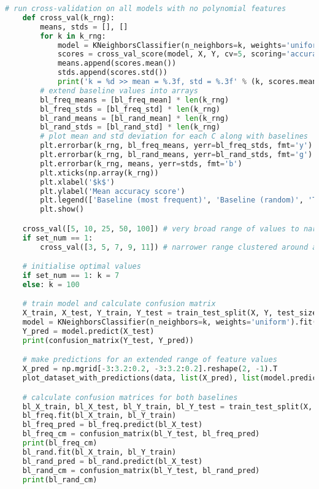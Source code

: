 \documentclass[12pt]{article}
\begin{document}
\begin{lstlisting}[language=Python]
    # run cross-validation on all models with no polynomial features
    def cross_val(k_rng):
        means, stds = [], []
        for k in k_rng:
            model = KNeighborsClassifier(n_neighbors=k, weights='uniform').fit(X, Y)
            scores = cross_val_score(model, X, Y, cv=5, scoring='accuracy')
            means.append(scores.mean())
            stds.append(scores.std())
            print('k = %d >> mean = %.3f, std = %.3f' % (k, scores.mean(), scores.std()))
        # extend baseline values into arrays
        bl_freq_means = [bl_freq_mean] * len(k_rng)
        bl_freq_stds = [bl_freq_std] * len(k_rng)
        bl_rand_means = [bl_rand_mean] * len(k_rng)
        bl_rand_stds = [bl_rand_std] * len(k_rng)
        # plot mean and std deviation for each C along with baselines
        plt.errorbar(k_rng, bl_freq_means, yerr=bl_freq_stds, fmt='y')
        plt.errorbar(k_rng, bl_rand_means, yerr=bl_rand_stds, fmt='g')
        plt.errorbar(k_rng, means, yerr=stds, fmt='b')
        plt.xticks(np.array(k_rng))
        plt.xlabel('$k$')
        plt.ylabel('Mean accuracy score')
        plt.legend(['Baseline (most frequent)', 'Baseline (random)', 'Trained model'])
        plt.show()

    cross_val([5, 10, 25, 50, 100]) # very broad range of values to narrow down optimal k
    if set_num == 1:
        cross_val([3, 5, 7, 9, 11]) # narrower range clustered around apparent optimal k

    # initialise optimal values
    if set_num == 1: k = 7
    else: k = 100

    # train model and calculate confusion matrix
    X_train, X_test, Y_train, Y_test = train_test_split(X, Y, test_size=0.2)
    model = KNeighborsClassifier(n_neighbors=k, weights='uniform').fit(X_train, Y_train)
    Y_pred = model.predict(X_test)
    print(confusion_matrix(Y_test, Y_pred))

    # make predictions for an extended range of feature values
    X_pred = np.mgrid[-3:3.2:0.2, -3:3.2:0.2].reshape(2, -1).T
    plot_dataset_with_predictions(data, list(X_pred), list(model.predict(X_pred)))

    # calculate confusion matrices for both baselines
    bl_X_train, bl_X_test, bl_Y_train, bl_Y_test = train_test_split(X, Y, test_size=0.2)
    bl_freq.fit(bl_X_train, bl_Y_train)
    bl_freq_pred = bl_freq.predict(bl_X_test)
    bl_freq_cm = confusion_matrix(bl_Y_test, bl_freq_pred)
    print(bl_freq_cm)
    bl_rand.fit(bl_X_train, bl_Y_train)
    bl_rand_pred = bl_rand.predict(bl_X_test)
    bl_rand_cm = confusion_matrix(bl_Y_test, bl_rand_pred)
    print(bl_rand_cm)


\end{lstlisting}
\end{document}
